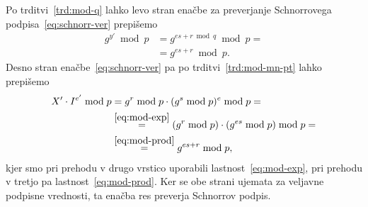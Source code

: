 Po trditvi~\ref{trd:mod-q} lahko levo stran enačbe za preverjanje Schnorrovega podpisa~\eqref{eq:schnorr-ver}
prepišemo
\begin{align*}
    g^{y'} \bmod p &= g^{es + r \bmod q} \bmod p = \\ 
                   &= g^{es + r} \bmod p. 
\end{align*}
Desno stran enačbe~\eqref{eq:schnorr-ver} pa po trditvi~\ref{trd:mod-mn-pt} lahko prepišemo
\begin{align*}
X' \cdot I^{e'} \bmod p &= g^r \bmod p \cdot (g^s \bmod p)^e \bmod p = \\
                        &\stackrel{\eqref{eq:mod-exp}}{=} (g^r \bmod p) \cdot (g^{es} \bmod p) \bmod p = \\ 
                        &\stackrel{\eqref{eq:mod-prod}}{=} g^{es + r} \bmod p,
\end{align*}
kjer smo pri prehodu v drugo vrstico uporabili lastnost~\eqref{eq:mod-exp}, pri prehodu v tretjo 
pa lastnost~\eqref{eq:mod-prod}. Ker se obe strani ujemata za veljavne podpisne vrednosti, ta enačba 
res preverja Schnorrov podpis.
